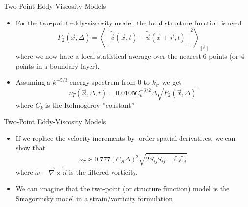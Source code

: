 \begin{frame}{Two-Point Eddy-Viscosity Models}
\begin{itemize}
	\item For the two-point eddy-viscosity model, the local structure function is used
	$$F_2(\vec{x},\Delta) = \left\langle \left[ \widetilde{\vec{u}}(\vec{x},t) - \widetilde{\vec{u}}(\vec{x}+\vec{r},t)\right]^2\right\rangle_{||\vec{r}||}$$
	where we now have a local statistical average over the nearest 6 points (or 4 points in a boundary layer).
	\item Assuming a $k^{-5/3}$ energy spectrum from 0 to $k_c$, we get
	$$\boxed{\nu_T(\vec{x}, \Delta, t) = 0.0105 C_k^{-3/2} \Delta \sqrt{F_2(\vec{x}, \Delta)}}$$
	where $C_k$ is the Kolmogorov ''constant''
\end{itemize}

\end{frame}

\begin{frame}{Two-Point Eddy-Viscosity Models}
\begin{itemize}
	\item If we replace the velocity increments by -order spatial derivatives, we can show that 
	$$\nu_T \approx 0.777 (C_S\Delta)^2 \sqrt{2\widetilde{S}_{ij}\widetilde{S}_{ij} - \tilde{\omega_i}\tilde{\omega_i}}$$
	where $\tilde{\omega} = \vec{\nabla} \times \widetilde{\vec{u}}$ is the filtered vorticity.
	\item We can imagine that the two-point (or structure function) model is the Smagorinsky model in a strain/vorticity formulation 
\end{itemize}

\end{frame}




